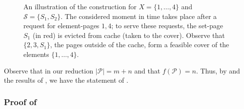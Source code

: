 \documentclass[11pt]{article}
\newcommand{\cP}{{\mathcal{P}}}
\newcommand{\cS}{{\mathcal{S}}}
\newtheorem{lemma}[thm]{Lemma}
\begin{document}
{\begin{figure}
		\caption{\label{fig:Y} An illustration of the construction for $X = \{1,\ldots,4\}$ and $\cS = \{S_1,S_2\}$. The considered moment in time takes place after a request for element-pages $1,4$; to serve these requests, the set-page $S_1$ (in red) is evicted from cache (taken to the cover). Observe that $\{2,3,S_1\}$, the pages outside of the cache, form a feasible cover of the elements $\{1,\ldots,4\}$.}
	\end{figure}
 
Observe that in our reduction $|\cP| = m+n$ and that $f(\cP) = n$. Thus, by  and the results of \cite{alon2003online,korman2004use}, we have the statement of . %




\subsubsection*{Proof of }

}
\end{document}
